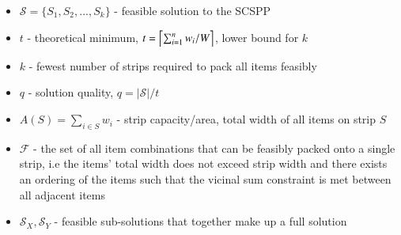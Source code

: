 \documentclass{elsarticle}
\begin{document}
\begin{itemize}
	\item $\mathcal{S} = \{S_1, S_2,...,S_k\}$ - feasible solution to the SCSPP
	\item $t$ - theoretical minimum, $t = \ceil*{\sum_{i=1}^{n}w_i / W}$, lower bound for $k$
	\item $k$ - fewest number of strips required to pack all items feasibly
	\item $q$ - solution quality, $q = |\mathcal{S}| / t$
	\item $A(S) = \sum_{i \in S}w_i$ - strip capacity/area, total width of all items on strip $S$
	\item $\mathcal{F}$ - the set of all item combinations that can be feasibly packed onto a single strip, i.e the items' total width does not exceed strip width and there exists an ordering of the items such that the vicinal sum constraint is met between all adjacent items
	\item $\mathcal{S}_X, \mathcal{S}_Y$ - feasible sub-solutions that together make up a full solution
\end{itemize}
\end{document}
